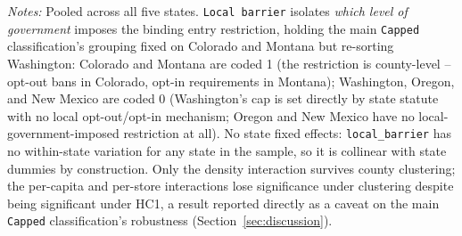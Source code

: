 \begin{table}[htbp]
\centering
\caption{Robustness: border $\times$ local-government-barrier interaction}
\label{tab:localbarrier_pooled}
\footnotesize
{}
\begin{minipage}{0.98\textwidth}
\vspace{0.3em}
\footnotesize
\textit{Notes:} Pooled across all five states. \texttt{Local barrier} isolates \emph{which level of
government} imposes the binding entry restriction, holding the main \texttt{Capped} classification's grouping
fixed on Colorado and Montana but re-sorting Washington: Colorado and Montana are coded 1 (the restriction is
county-level -- opt-out bans in Colorado, opt-in requirements in Montana); Washington, Oregon, and New Mexico
are coded 0 (Washington's cap is set directly by state statute with no local opt-out/opt-in mechanism; Oregon
and New Mexico have no local-government-imposed restriction at all). No state fixed effects: \texttt{local\_barrier}
has no within-state variation for any state in the sample, so it is collinear with state dummies by
construction. Only the density interaction survives county clustering; the per-capita and per-store
interactions lose significance under clustering despite being significant under HC1, a result reported directly
as a caveat on the main \texttt{Capped} classification's robustness (Section~\ref{sec:discussion}).
\end{minipage}
\end{table}
